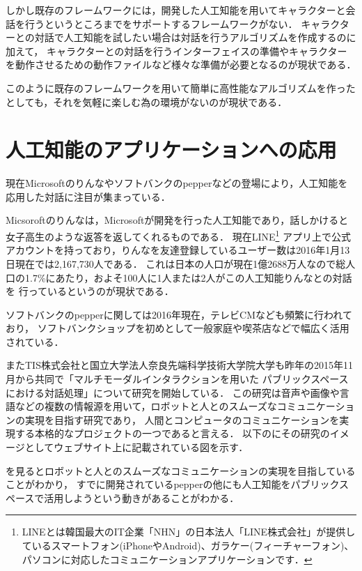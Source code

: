 しかし既存のフレームワークには，開発した人工知能を用いてキャラクターと会話を行うというところまでをサポートするフレームワークがない．
キャラクターとの対話で人工知能を試したい場合は対話を行うアルゴリズムを作成するのに加えて，
キャラクターとの対話を行うインターフェイスの準備やキャラクターを動作させるための動作ファイルなど様々な準備が必要となるのが現状である．

このように既存のフレームワークを用いて簡単に高性能なアルゴリズムを作ったとしても，それを気軽に楽しむ為の環境がないのが現状である．

\newpage

\section{人工知能のアプリケーションへの応用}
現在Microsoftのりんな\cite{rinna}やソフトバンクのpepper\cite{pepper}などの登場により，人工知能を応用した対話に注目が集まっている．

Micsoroftのりんなは，Microsoftが開発を行った人工知能であり，話しかけると女子高生のような返答を返してくれるものである．
現在LINE\footnote{LINEとは韓国最大のIT企業「NHN」の日本法人「LINE株式会社」が提供しているスマートフォン(iPhoneやAndroid)、ガラケー(フィーチャーフォン)、パソコンに対応したコミュニケーションアプリケーションです．\cite{line}}
アプリ上で公式アカウントを持っており，りんなを友達登録しているユーザー数は2016年1月13日現在では2,167,730人である．
これは日本の人口が現在1億2688万人\cite{humen}なので総人口の1.7\%にあたり，およそ100人に1人または2人がこの人工知能りんなとの対話を
行っているというのが現状である．

ソフトバンクのpepperに関しては2016年現在，テレビCMなども頻繁に行われており，
ソフトバンクショップを初めとして一般家庭や喫茶店などで幅広く活用されている．

またTIS株式会社と国立大学法人奈良先端科学技術大学院大学も昨年の2015年11月から共同で「マルチモーダルインタラクションを用いた
パブリックスペースにおける対話処理」について研究を開始している．\cite{tis}
この研究は音声や画像や言語などの複数の情報源を用いて，ロボットと人とのスムーズなコミュニケーションの実現を目指す研究であり，
人間とコンピュータのコミュニケーションを実現する本格的なプロジェクトの一つであると言える．
以下のにその研究のイメージとしてウェブサイト上に記載されている図を示す．


を見るとロボットと人とのスムーズなコミュニケーションの実現を目指していることがわかり，
すでに開発されているpepperの他にも人工知能をパブリックスペースで活用しようという動きがあることがわかる．


